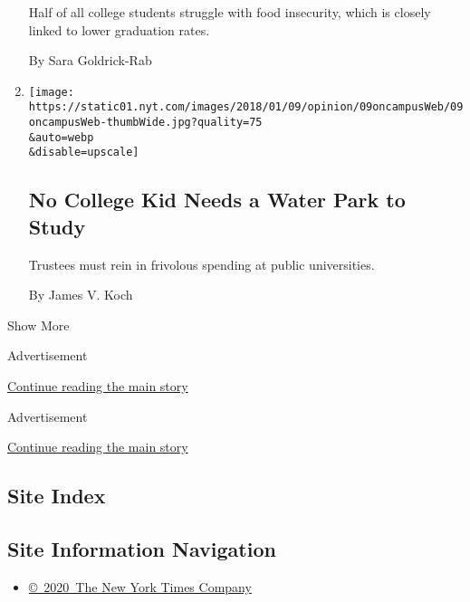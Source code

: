 \begin{enumerate}
  Half of all college students struggle with food insecurity, which is
  closely linked to lower graduation rates.

  By Sara Goldrick-Rab
\item
  \href{/2018/01/09/opinion/trustees-tuition-lazy-rivers.html}{}

  \texttt{[image: https://static01.nyt.com/images/2018/01/09/opinion/09oncampusWeb/09oncampusWeb-thumbWide.jpg?quality=75\\\&auto=webp\\\&disable=upscale]}

  \hypertarget{no-college-kid-needs-a-water-park-to-study}{%
  \subsection{No College Kid Needs a Water Park to
  Study}\label{no-college-kid-needs-a-water-park-to-study}}

  Trustees must rein in frivolous spending at public universities.

  By James V. Koch
\end{enumerate}

Show More

Advertisement

\protect\hyperlink{after-mid2}{Continue reading the main story}

Advertisement

\protect\hyperlink{after-mktg}{Continue reading the main story}

\hypertarget{site-index}{%
\subsection{Site Index}\label{site-index}}

\hypertarget{site-information-navigation}{%
\subsection{Site Information
Navigation}\label{site-information-navigation}}

\begin{itemize}
\tightlist
\item
  \href{https://help.nytimes.com/hc/en-us/articles/115014792127-Copyright-notice}{©~2020~The
  New York Times Company}
\end{itemize}

